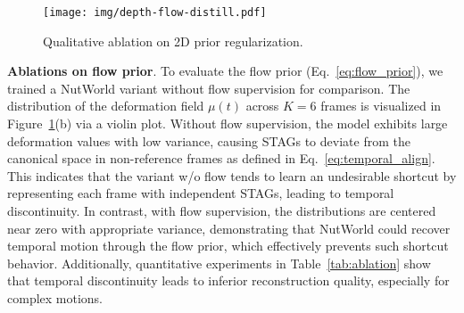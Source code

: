 \begin{figure}[h!]
\vspace{-4mm}
\setlength{\abovecaptionskip}{0.1cm}
\setlength{\belowcaptionskip}{0cm}
\centering
\texttt{[image: img/depth-flow-distill.pdf]}
\caption{Qualitative ablation on 2D prior regularization.}
\label{fig:prior_ablation}
\vspace{-4mm}
\end{figure}


\noindent\textbf{Ablations on flow prior}. To evaluate the flow prior (Eq.~\ref{eq:flow_prior}), we trained a NutWorld variant without flow supervision for comparison. The distribution of the deformation field $\mu(t)$ across $K=6$ frames is visualized in Figure~\ref{fig:prior_ablation}(b) via a violin plot. Without flow supervision, the model exhibits large deformation values with low variance, causing STAGs to deviate from the canonical space in non-reference frames as defined in Eq.~\ref{eq:temporal_align}. This indicates that the variant w/o flow tends to learn an undesirable shortcut by representing each frame with independent STAGs, leading to temporal discontinuity. In contrast, with flow supervision, the distributions are centered near zero with appropriate variance, demonstrating that NutWorld could recover temporal motion through the flow prior, which effectively prevents such shortcut behavior. Additionally, quantitative experiments in Table~\ref{tab:ablation} show that temporal discontinuity leads to inferior reconstruction quality, especially for complex motions.







